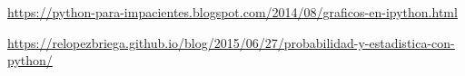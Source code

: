 \documentclass{article}
\begin{document}

{\url{https://python-para-impacientes.blogspot.com/2014/08/graficos-en-ipython.html}}
 
    
{\url{https://relopezbriega.github.io/blog/2015/06/27/probabilidad-y-estadistica-con-python/}}
\end{document}
